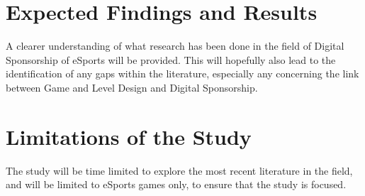 \documentclass[10pt,twoside]{article}
\begin{document}
\section{Expected Findings and Results}
A clearer understanding of what research has been done in the field of Digital Sponsorship of eSports will be provided. This will hopefully also lead to the identification of any gaps within the literature, especially any concerning the link between Game and Level Design and Digital Sponsorship.

\section{Limitations of the Study}
The study will be time limited to explore the most recent literature in the field, and will be limited to eSports games only, to ensure that the study is focused.



\end{document}
